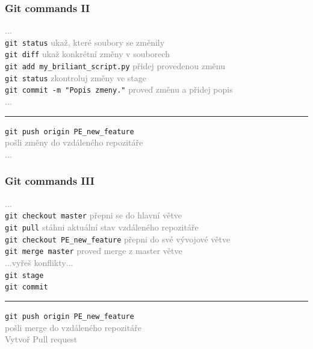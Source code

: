 \documentclass[10pt, xcolor=dvipsnames]{beamer} %
\begin{document}
\begin{frame}[fragile]
  \frametitle{Git commands II}
  
  \textcolor{gray}{$\ldots$}\\
  \verb'git status' \hfill\textcolor{gray}{ukaž, které soubory se změnily}\\
  \verb'git diff' \hfill\textcolor{gray}{ukaž konkrétní změny v souborech}\\
  \verb'git add my_briliant_script.py' \hfill\textcolor{gray}{přidej provedenou změnu}\\
  \verb'git status' \hfill\textcolor{gray}{zkontroluj změny ve stage}\\
  \verb'git commit -m "Popis zmeny."' \hfill\textcolor{gray}{proveď změnu a přidej popis}\\
  \textcolor{gray}{$\ldots$}
  
  \vspace{0.5cm}
  {\color{red}\rule{\textwidth}{1pt}}
  \verb'git push origin PE_new_feature'\\ \hfill\textcolor{gray}{pošli změny do vzdáleného repozitáře}\\
  \textcolor{gray}{$\ldots$}
\end{frame}

\begin{frame}[fragile]
  \frametitle{Git commands III}
  
  \textcolor{gray}{$\ldots$}\\
  \verb'git checkout master' \hfill\textcolor{gray}{přepni se do hlavní větve}\\
  \verb'git pull' \hfill\textcolor{gray}{stáhni aktuální stav vzdáleného repozitáře}\\
  \verb'git checkout PE_new_feature' \hfill\textcolor{gray}{přepni do své vývojové větve}\\
  
  \vspace{0.5cm}
  \verb'git merge master' \hfill\textcolor{gray}{proveď merge z master větve}\\
  \textcolor{gray}{$\ldots$}\textcolor{gray}{vyřeš konflikty}\textcolor{gray}{$\ldots$}\\
  {\color{gray} \verb'git stage'}\\
  {\color{gray} \verb'git commit'}
  
  \vspace{0.5cm}
  {\color{red}\rule{\textwidth}{1pt}}
  \verb'git push origin PE_new_feature'\\ \hfill\textcolor{gray}{pošli merge do vzdáleného repozitáře}\\
  \textcolor{gray}{Vytvoř Pull request}
\end{frame}
\end{document}
